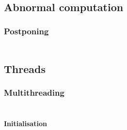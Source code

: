 \subsection{Abnormal computation}\hypertarget{abnormal-computation}{}\label{abnormal-computation}

\subsubsection{Postponing}\hypertarget{postponing}{}\label{postponing}

\begin{align*}
  [ \
  \KEY{Entity} \quad & \NAMEHYPER{../Computations/Abnormal}{Postponing}{postponing} \\
  \KEY{Funcon} \quad & \NAMEHYPER{../Computations/Abnormal}{Postponing}{postpone} \\
  \KEY{Funcon} \quad & \NAMEHYPER{../Computations/Abnormal}{Postponing}{postpone-after-effect} \\
  \KEY{Funcon} \quad & \NAMEHYPER{../Computations/Abnormal}{Postponing}{after-effect}
  \ ]
\end{align*}
\subsection{Threads}\hypertarget{threads}{}\label{threads}

\subsubsection{Multithreading}\hypertarget{multithreading}{}\label{multithreading}

\begin{align*}
  [ \
  \KEY{Datatype} \quad & \NAMEHYPER{../Computations/Threads}{Multithreading}{thread-ids} \\
  \KEY{Datatype} \quad & \NAMEHYPER{../Computations/Threads}{Multithreading}{threads} \\
  \KEY{Funcon} \quad & \NAMEHYPER{../Computations/Threads}{Multithreading}{thread-joinable} \\
  \KEY{Funcon} \quad & \NAMEHYPER{../Computations/Threads}{Multithreading}{thread-detached}
  \ ]
\end{align*}
\paragraph{Initialisation}\hypertarget{initialisation}{}\label{initialisation}

\begin{align*}
  [ \
  \KEY{Funcon} \quad & \NAMEHYPER{../Computations/Threads}{Multithreading}{initialise-multithreading}
  \ ]
\end{align*}
